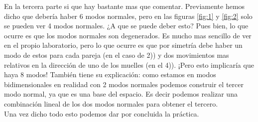 \documentclass[12pt,a4paper]{article}
\begin{document}
En la tercera parte si que hay bastante mas que comentar. Previamente hemos dicho que debería haber 6 modos normales, pero en las figuras \ref{fig:1} y \ref{fig:2} solo se pueden ver 4 modos normales. ¿A que se puede deber esto? Pues bien, lo que ocurre es que los modos normales son degenerados. Es mucho mas sencillo de ver en el propio laboratorio, pero lo que ocurre es que por simetría debe haber un modo de estos para cada pareja (en el caso de 2)) y dos movimientos mas relativos en la dirección de uno de los muelles (en el 4)). ¡Pero esto implicaría que haya 8 modos! También tiene su explicación: como estamos en modos bidimensionales en realidad con 2 modos normales podemos construir el tercer modo normal, ya que es una base del espacio. Es decir podemos realizar una combinación lineal de los dos modos normales para obtener el tercero. \\

Una vez dicho todo esto podemos dar por concluida la práctica.
\end{document}

